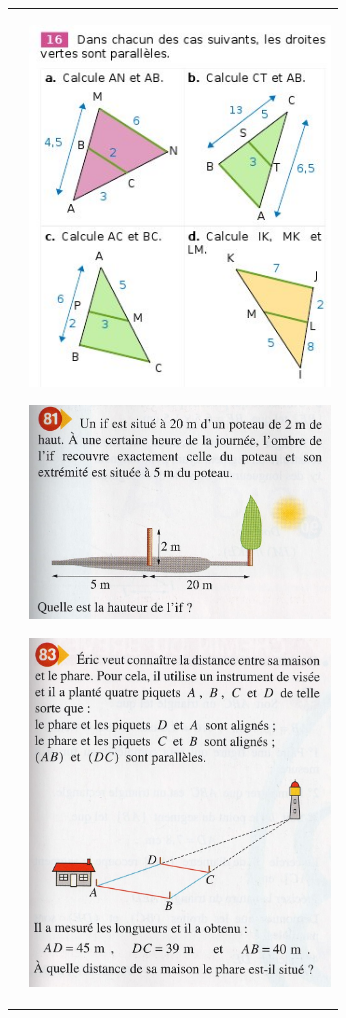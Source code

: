 \documentclass[12pt, twoside]{article}
\begin{document}
\begin{tabular}{cc}
\begin{minipage}{9cm}
\end{minipage}
&
\begin{minipage}{9cm}
\includegraphics[width=8cm]{images/ex16.jpg}

\enskip


\includegraphics[width=8cm]{images/ex81.jpg}

\enskip

\includegraphics[width=8cm]{images/ex83.jpg}
\end{minipage}
\end{tabular}
\end{document}
